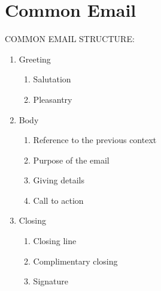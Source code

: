 \section{Common Email}

COMMON EMAIL STRUCTURE:
\begin{enumerate}
\item Greeting
	\begin{enumerate}
	\item Salutation
	\item Pleasantry	
	\end{enumerate}
\item Body
	\begin{enumerate}
	\item Reference to the previous context
	\item Purpose of the email
	\item Giving details
	\item Call to action
	\end{enumerate}
\item Closing
	\begin{enumerate}
	\item Closing line
	\item Complimentary closing
	\item Signature
	\end{enumerate}
\end{enumerate}

\newpage